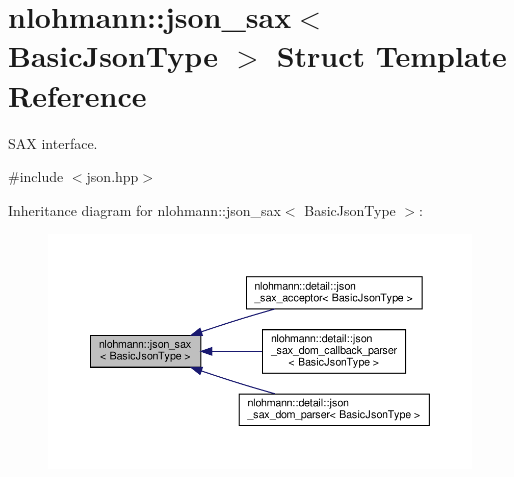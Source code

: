 \hypertarget{structnlohmann_1_1json__sax}{}\section{nlohmann\+:\+:json\+\_\+sax$<$ Basic\+Json\+Type $>$ Struct Template Reference}
\label{structnlohmann_1_1json__sax}


S\+AX interface.  




{\ttfamily \#include $<$json.\+hpp$>$}



Inheritance diagram for nlohmann\+:\+:json\+\_\+sax$<$ Basic\+Json\+Type $>$\+:
\nopagebreak
\begin{figure}[H]
\begin{center}
\leavevmode
\includegraphics[width=350pt]{structnlohmann_1_1json__sax__inherit__graph}
\end{center}
\end{figure}
